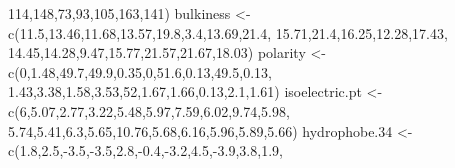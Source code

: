 \documentclass[
]{book}
\newenvironment{Shaded}{\begin{snugshade}}{\end{snugshade}}
\newcommand{\DecValTok}[1]{\textcolor[rgb]{0.00,0.00,0.81}{#1}}
\newcommand{\FloatTok}[1]{\textcolor[rgb]{0.00,0.00,0.81}{#1}}
\newcommand{\FunctionTok}[1]{\textcolor[rgb]{0.00,0.00,0.00}{#1}}
\newcommand{\NormalTok}[1]{#1}
\newcommand{\OtherTok}[1]{\textcolor[rgb]{0.56,0.35,0.01}{#1}}
\newcommand{\SpecialCharTok}[1]{\textcolor[rgb]{0.00,0.00,0.00}{#1}}
\begin{document}
\begin{Shaded}
\begin{Highlighting}[]
              \DecValTok{114}\NormalTok{,}\DecValTok{148}\NormalTok{,}\DecValTok{73}\NormalTok{,}\DecValTok{93}\NormalTok{,}\DecValTok{105}\NormalTok{,}\DecValTok{163}\NormalTok{,}\DecValTok{141}\NormalTok{)}
\NormalTok{bulkiness }\OtherTok{\textless{}{-}}\FunctionTok{c}\NormalTok{(}\FloatTok{11.5}\NormalTok{,}\FloatTok{13.46}\NormalTok{,}\FloatTok{11.68}\NormalTok{,}\FloatTok{13.57}\NormalTok{,}\FloatTok{19.8}\NormalTok{,}\FloatTok{3.4}\NormalTok{,}\FloatTok{13.69}\NormalTok{,}\FloatTok{21.4}\NormalTok{,}
              \FloatTok{15.71}\NormalTok{,}\FloatTok{21.4}\NormalTok{,}\FloatTok{16.25}\NormalTok{,}\FloatTok{12.28}\NormalTok{,}\FloatTok{17.43}\NormalTok{,}
              \FloatTok{14.45}\NormalTok{,}\FloatTok{14.28}\NormalTok{,}\FloatTok{9.47}\NormalTok{,}\FloatTok{15.77}\NormalTok{,}\FloatTok{21.57}\NormalTok{,}\FloatTok{21.67}\NormalTok{,}\FloatTok{18.03}\NormalTok{)}
\NormalTok{polarity  }\OtherTok{\textless{}{-}}\FunctionTok{c}\NormalTok{(}\DecValTok{0}\NormalTok{,}\FloatTok{1.48}\NormalTok{,}\FloatTok{49.7}\NormalTok{,}\FloatTok{49.9}\NormalTok{,}\FloatTok{0.35}\NormalTok{,}\DecValTok{0}\NormalTok{,}\FloatTok{51.6}\NormalTok{,}\FloatTok{0.13}\NormalTok{,}\FloatTok{49.5}\NormalTok{,}\FloatTok{0.13}\NormalTok{,}
              \FloatTok{1.43}\NormalTok{,}\FloatTok{3.38}\NormalTok{,}\FloatTok{1.58}\NormalTok{,}\FloatTok{3.53}\NormalTok{,}\DecValTok{52}\NormalTok{,}\FloatTok{1.67}\NormalTok{,}\FloatTok{1.66}\NormalTok{,}\FloatTok{0.13}\NormalTok{,}\FloatTok{2.1}\NormalTok{,}\FloatTok{1.61}\NormalTok{)}
\NormalTok{isoelectric.pt }\OtherTok{\textless{}{-}}\FunctionTok{c}\NormalTok{(}\DecValTok{6}\NormalTok{,}\FloatTok{5.07}\NormalTok{,}\FloatTok{2.77}\NormalTok{,}\FloatTok{3.22}\NormalTok{,}\FloatTok{5.48}\NormalTok{,}\FloatTok{5.97}\NormalTok{,}\FloatTok{7.59}\NormalTok{,}\FloatTok{6.02}\NormalTok{,}\FloatTok{9.74}\NormalTok{,}\FloatTok{5.98}\NormalTok{,}
                   \FloatTok{5.74}\NormalTok{,}\FloatTok{5.41}\NormalTok{,}\FloatTok{6.3}\NormalTok{,}\FloatTok{5.65}\NormalTok{,}\FloatTok{10.76}\NormalTok{,}\FloatTok{5.68}\NormalTok{,}\FloatTok{6.16}\NormalTok{,}\FloatTok{5.96}\NormalTok{,}\FloatTok{5.89}\NormalTok{,}\FloatTok{5.66}\NormalTok{)}
\NormalTok{hydrophobe}\FloatTok{.34} \OtherTok{\textless{}{-}}\FunctionTok{c}\NormalTok{(}\FloatTok{1.8}\NormalTok{,}\FloatTok{2.5}\NormalTok{,}\SpecialCharTok{{-}}\FloatTok{3.5}\NormalTok{,}\SpecialCharTok{{-}}\FloatTok{3.5}\NormalTok{,}\FloatTok{2.8}\NormalTok{,}\SpecialCharTok{{-}}\FloatTok{0.4}\NormalTok{,}\SpecialCharTok{{-}}\FloatTok{3.2}\NormalTok{,}\FloatTok{4.5}\NormalTok{,}\SpecialCharTok{{-}}\FloatTok{3.9}\NormalTok{,}\FloatTok{3.8}\NormalTok{,}\FloatTok{1.9}\NormalTok{,}

\end{Highlighting}
\end{Shaded}
\end{document}
